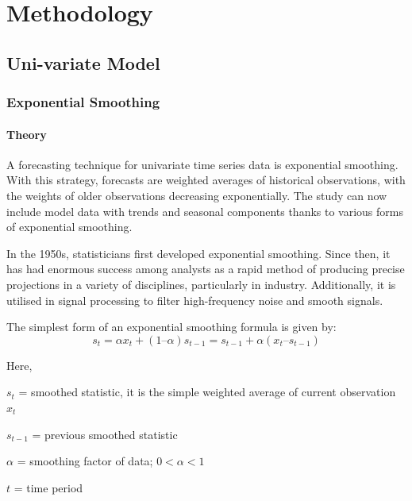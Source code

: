 \chapter{Methodology}

\section{Uni-variate Model}
\subsection{Exponential Smoothing}

\subsubsection{Theory}
A forecasting technique for univariate time series data is exponential smoothing. With this strategy, forecasts are weighted averages of historical observations, with the weights of older observations decreasing exponentially. The study can now include model data with trends and seasonal components thanks to various forms of exponential smoothing.

In the 1950s, statisticians first developed exponential smoothing. Since then, it has had enormous success among analysts as a rapid method of producing precise projections in a variety of disciplines, particularly in industry. Additionally, it is utilised in signal processing to filter high-frequency noise and smooth signals.

The simplest form of an exponential smoothing formula is given by:
$$ s_t = \alpha x_t+(1 – \alpha)s_{t-1}= s_{t-1}+ \alpha(x_t – s_{t-1}) $$

Here,

$s_t$ = smoothed statistic, it is the simple weighted average of current observation $x_t$

$s_{t-1}$ = previous smoothed statistic

$\alpha$ = smoothing factor of data; $0 < \alpha < 1$

$t$ = time period

